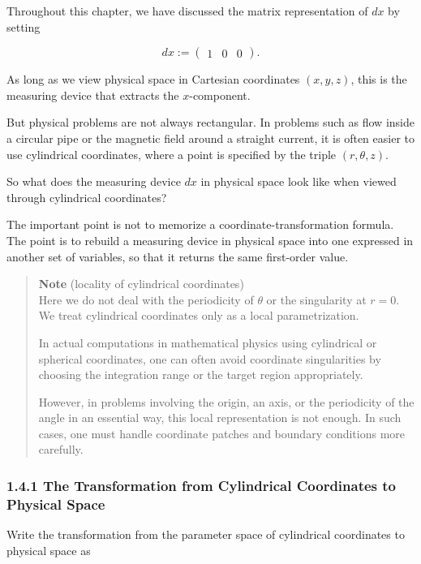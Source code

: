 Throughout this chapter, we have discussed the matrix representation of
\(dx\) by setting

\[
dx:=\begin{pmatrix}1&0&0\end{pmatrix}.
\]

As long as we view physical space in Cartesian coordinates \((x,y,z)\),
this is the measuring device that extracts the \(x\)-component.

But physical problems are not always rectangular. In problems such as
flow inside a circular pipe or the magnetic field around a straight
current, it is often easier to use cylindrical coordinates, where a
point is specified by the triple \((r,\theta,z)\).

So what does the measuring device \(dx\) in physical space look like
when viewed through cylindrical coordinates?

The important point is not to memorize a coordinate-transformation
formula. The point is to rebuild a measuring device in physical space
into one expressed in another set of variables, so that it returns the
same first-order value.

\begin{quote}
\textbf{Note} (locality of cylindrical coordinates)\\
Here we do not deal with the periodicity of \(\theta\) or the
singularity at \(r=0\). We treat cylindrical coordinates only as a local
parametrization.

In actual computations in mathematical physics using cylindrical or
spherical coordinates, one can often avoid coordinate singularities by
choosing the integration range or the target region appropriately.

However, in problems involving the origin, an axis, or the periodicity
of the angle in an essential way, this local representation is not
enough. In such cases, one must handle coordinate patches and boundary
conditions more carefully.
\end{quote}

\hypertarget{the-transformation-from-cylindrical-coordinates-to-physical-space}{%
\subsubsection{1.4.1 The Transformation from Cylindrical Coordinates to
Physical
Space}\label{the-transformation-from-cylindrical-coordinates-to-physical-space}}

Write the transformation from the parameter space of cylindrical
coordinates to physical space as

